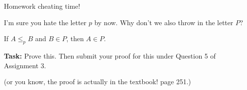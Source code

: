 \documentclass{beamer}
\begin{document}
\begin{frame}{Homework cheating time!} 

I'm sure you hate the letter $p$ by now. Why don't we also throw in the letter $P$?

\begin{theorem}
If $A \leq_p B$ and $B \in P$, then $A \in P$.
\end{theorem}

\textbf{Task:} Prove this. Then submit your proof for this under Question 5 of Assignment 3.

(or you know, the proof is actually in the textbook! page 251.)

\end{frame}
\end{document}

